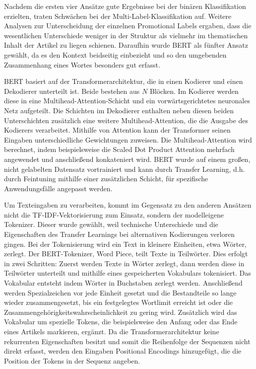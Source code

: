 Nachdem die ersten vier Ansätze gute Ergebnisse bei der binären Klassifikation erzielten, traten Schwächen bei der Multi-Label-Klassifikation auf. Weitere Analysen zur Unterscheidung der einzelnen Promotional Labels ergaben, dass die wesentlichen Unterschiede weniger in der Struktur als vielmehr im thematischen Inhalt der Artikel zu liegen schienen. Daraufhin wurde BERT als fünfter Ansatz gewählt, da es den Kontext beidseitig einbezieht und so den umgebenden Zusammenhang eines Wortes besonders gut erfasst.

BERT basiert auf der Transformerarchitektur, die in einen Kodierer und einen Dekodierer unterteilt ist. Beide bestehen aus $N$ Blöcken. Im Kodierer werden diese in eine Multihead-Attention-Schicht und ein vorwärtsgerichtetes neuronales Netz aufgeteilt. Die Schichten im Dekodierer enthalten neben diesen beiden Unterschichten zusätzlich eine weitere Multihead-Attention, die die Ausgabe des Kodierers verarbeitet. Mithilfe von Attention kann der Transformer seinen Eingaben unterschiedliche Gewichtungen zuweisen. Die Multihead-Attention wird berechnet, indem beispielsweise die Scaled Dot Product Attention \cite{Vaswani2017} mehrfach angewendet und anschließend konkateniert wird. BERT wurde auf einem großen, nicht gelabelten Datensatz vortrainiert und kann durch Transfer Learning, d.h. durch Feintuning mithilfe einer zusätzlichen Schicht, für spezifische Anwendungsfälle angepasst werden. \cite{Vaswani2017}  \cite{Devlin2018}

Um Texteingaben zu verarbeiten, kommt im Gegensatz zu den anderen Ansätzen nicht die TF-IDF-Vektorisierung zum Einsatz, sondern der modelleigene Tokenizer. Dieser wurde gewählt, weil technische Unterschiede und die Eigenschaften des Transfer Learnings bei alternativen Kodierungen verloren gingen. Bei der Tokenisierung wird ein Text in kleinere Einheiten, etwa Wörter, zerlegt. Der BERT-Tokenizer, Word Piece, teilt Texte in Teilwörter. Dies erfolgt in zwei Schritten: Zuerst werden Texte in Wörter zerlegt, dann werden diese in Teilwörter unterteilt und mithilfe eines gespeicherten Vokabulars tokenisiert. Das Vokabular entsteht indem Wörter in Buchstaben zerlegt werden. Anschließend werden Spezialzeichen vor jede Einheit gesetzt und die Bestandteile so lange wieder zusammengesetzt, bis ein festgelegtes Wortlimit erreicht ist oder die Zusammengehörigkeitswahrscheinlichkeit zu gering wird. Zusätzlich wird das Vokabular um spezielle Tokens, die beispielsweise den Anfang oder das Ende eines Artikels markieren, ergänzt.
\cite{Song2020} \cite{Sennrich2015} \cite{Schuster2012}
Da die Transformerarchitektur keine rekurrenten Eigenschaften besitzt und somit die Reihenfolge der Sequenzen nicht direkt erfasst, werden den Eingaben Positional Encodings hinzugefügt, die die Position der Tokens in der Sequenz angeben.

